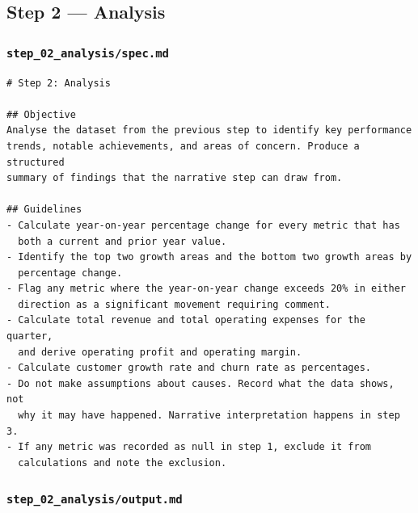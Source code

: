 \documentclass[12pt, a4paper]{article}
\begin{document}
\subsection{Step 2 --- Analysis}

\subsubsection{\texttt{step\_02\_analysis/spec.md}}

\begin{lstlisting}[language={}]
# Step 2: Analysis

## Objective
Analyse the dataset from the previous step to identify key performance
trends, notable achievements, and areas of concern. Produce a structured
summary of findings that the narrative step can draw from.

## Guidelines
- Calculate year-on-year percentage change for every metric that has
  both a current and prior year value.
- Identify the top two growth areas and the bottom two growth areas by
  percentage change.
- Flag any metric where the year-on-year change exceeds 20% in either
  direction as a significant movement requiring comment.
- Calculate total revenue and total operating expenses for the quarter,
  and derive operating profit and operating margin.
- Calculate customer growth rate and churn rate as percentages.
- Do not make assumptions about causes. Record what the data shows, not
  why it may have happened. Narrative interpretation happens in step 3.
- If any metric was recorded as null in step 1, exclude it from
  calculations and note the exclusion.
\end{lstlisting}

\subsubsection{\texttt{step\_02\_analysis/output.md}}
\end{document}
